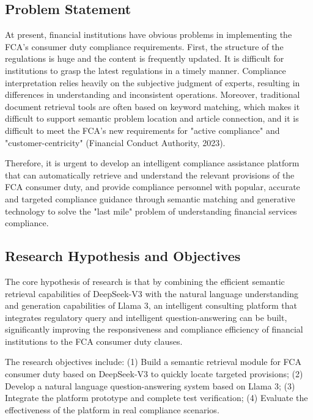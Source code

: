 \documentclass[a4paper,11pt]{article}
\begin{document}
\subsection{Problem Statement}

At present, financial institutions have obvious problems in implementing the FCA's consumer duty compliance requirements. First, the structure of the regulations is huge and the content is frequently updated. It is difficult for institutions to grasp the latest regulations in a timely manner. Compliance interpretation relies heavily on the subjective judgment of experts, resulting in differences in understanding and inconsistent operations. Moreover, traditional document retrieval tools are often based on keyword matching, which makes it difficult to support semantic problem location and article connection, and it is difficult to meet the FCA's new requirements for "active compliance" and "customer-centricity" (Financial Conduct Authority, 2023).

Therefore, it is urgent to develop an intelligent compliance assistance platform that can automatically retrieve and understand the relevant provisions of the FCA consumer duty, and provide compliance personnel with popular, accurate and targeted compliance guidance through semantic matching and generative technology to solve the "last mile" problem of understanding financial services compliance.

\subsection{Research Hypothesis and Objectives}

The core hypothesis of research is that by combining the efficient semantic retrieval capabilities of DeepSeek-V3 with the natural language understanding and generation capabilities of Llama 3, an intelligent consulting platform that integrates regulatory query and intelligent question-answering can be built, significantly improving the responsiveness and compliance efficiency of financial institutions to the FCA consumer duty clauses.

The research objectives include:
(1) Build a semantic retrieval module for FCA consumer duty based on DeepSeek-V3 to quickly locate targeted provisions;
(2) Develop a natural language question-answering system based on Llama 3;
(3) Integrate the platform prototype and complete test verification;
(4) Evaluate the effectiveness of the platform in real compliance scenarios.
\end{document}

